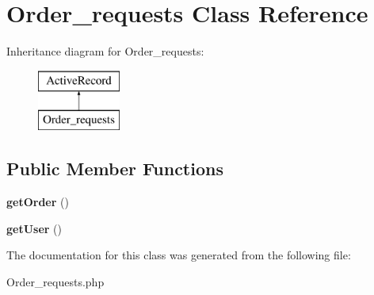 \hypertarget{classapp_1_1models_1_1_order__requests}{}\section{Order\+\_\+requests Class Reference}
\label{classapp_1_1models_1_1_order__requests}
Inheritance diagram for Order\+\_\+requests\+:\begin{figure}[H]
\begin{center}
\leavevmode
\includegraphics[height=2.000000cm]{classapp_1_1models_1_1_order__requests}
\end{center}
\end{figure}
\subsection*{Public Member Functions}
\begin{DoxyCompactItemize}
\item 
\hypertarget{classapp_1_1models_1_1_order__requests_a52f1787c1a4941f65bf728ff3289b626}{}\label{classapp_1_1models_1_1_order__requests_a52f1787c1a4941f65bf728ff3289b626} 
{\bfseries get\+Order} ()
\item 
\hypertarget{classapp_1_1models_1_1_order__requests_ae81b7186fb97a7c6457edcc68c9aa2ef}{}\label{classapp_1_1models_1_1_order__requests_ae81b7186fb97a7c6457edcc68c9aa2ef} 
{\bfseries get\+User} ()
\end{DoxyCompactItemize}


The documentation for this class was generated from the following file\+:\begin{DoxyCompactItemize}
\item 
Order\+\_\+requests.\+php\end{DoxyCompactItemize}
